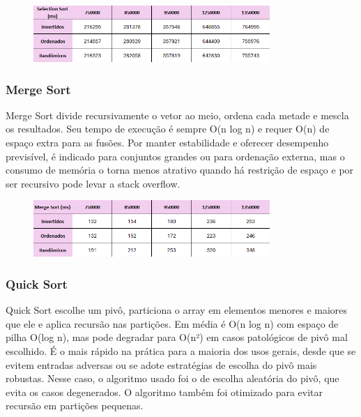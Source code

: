 \documentclass[a4paper, 12pt]{article}
\begin{document}
            \begin{figure}[ht]
                \centering
                \includegraphics[width=0.8\textwidth]{images/selection.png}
            \end{figure}

        \subsubsection{Merge Sort}
            Merge Sort divide recursivamente o vetor ao meio, ordena cada metade e mescla os resultados. Seu tempo de execução é sempre O(n log n) e requer O(n) de espaço extra para as fusões. Por manter estabilidade e oferecer desempenho previsível, é indicado para conjuntos grandes ou para ordenação externa, mas o consumo de memória o torna menos atrativo quando há restrição de espaço e por ser recursivo pode levar a stack overflow.

            \begin{figure}[h]
                \centering
                \includegraphics[width=0.8\textwidth]{images/merge.png}
            \end{figure}

        \subsubsection{Quick Sort}
            Quick Sort escolhe um pivô, particiona o array em elementos menores e maiores que ele e aplica recursão nas partições. Em média é O(n log n) com espaço de pilha O(log n), mas pode degradar para O(n²) em casos patológicos de pivô mal escolhido. É o mais rápido na prática para a maioria dos usos gerais, desde que se evitem entradas adversas ou se adote estratégias de escolha do pivô mais robustas. Nesse caso, o algoritmo usado foi o de escolha aleatória do pivô, que evita os casos degenerados. O algoritmo também foi otimizado para evitar recursão em partições pequenas.
\end{document}
